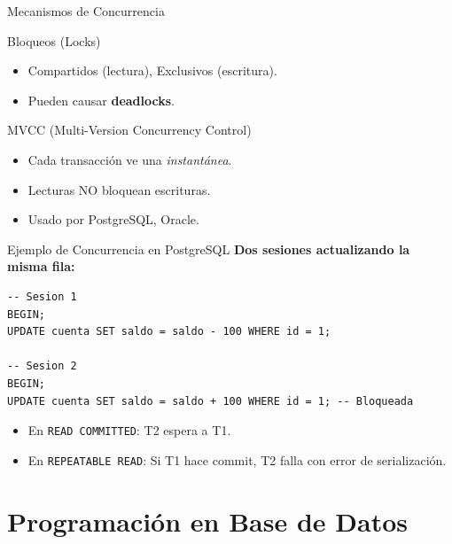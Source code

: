 \documentclass[aspectratio=169, 10pt, xcolor=table]{beamer}
\begin{document}
\begin{frame}{Mecanismos de Concurrencia}
    \begin{block}{Bloqueos (Locks)}
        \begin{itemize}
            \item Compartidos (lectura), Exclusivos (escritura).
            \item Pueden causar \textbf{deadlocks}.
        \end{itemize}
    \end{block}
    \begin{block}{MVCC (Multi-Version Concurrency Control)}
        \begin{itemize}
            \item Cada transacción ve una \textit{instantánea}.
            \item Lecturas NO bloquean escrituras.
            \item Usado por PostgreSQL, Oracle.
        \end{itemize}
    \end{block}
\end{frame}

\begin{frame}[fragile]{Ejemplo de Concurrencia en PostgreSQL}
    \textbf{Dos sesiones actualizando la misma fila:}
\begin{verbatim}
-- Sesion 1
BEGIN;
UPDATE cuenta SET saldo = saldo - 100 WHERE id = 1;

-- Sesion 2
BEGIN;
UPDATE cuenta SET saldo = saldo + 100 WHERE id = 1; -- Bloqueada
\end{verbatim}
    \begin{itemize}
        \item En \texttt{READ COMMITTED}: T2 espera a T1.
        \item En \texttt{REPEATABLE READ}: Si T1 hace commit, T2 falla con error de serialización.
    \end{itemize}
\end{frame}

\section{Programación en Base de Datos}
\end{document}
